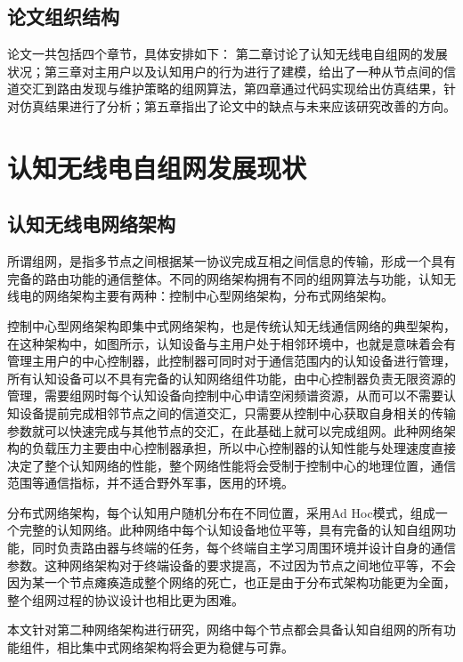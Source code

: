 \documentclass[a4paper,AutoFakeBold,oneside,12pt]{book}
\begin{document}
\section{论文组织结构}
  论文一共包括四个章节，具体安排如下：
  第二章讨论了认知无线电自组网的发展状况；第三章对主用户以及认知用户的行为进行了建模，给出了一种从节点间的信道交汇到路由发现与维护策略的组网算法，第四章通过代码实现给出仿真结果，针对仿真结果进行了分析；第五章指出了论文中的缺点与未来应该研究改善的方向。
\chapter{认知无线电自组网发展现状}
\section{认知无线电网络架构}
  所谓组网，是指多节点之间根据某一协议完成互相之间信息的传输，形成一个具有完备的路由功能的通信整体。不同的网络架构拥有不同的组网算法与功能，认知无线电的网络架构主要有两种：控制中心型网络架构，分布式网络架构。
  
  控制中心型网络架构即集中式网络架构，也是传统认知无线通信网络的典型架构，在这种架构中，如图所示，认知设备与主用户处于相邻环境中，也就是意味着会有管理主用户的中心控制器，此控制器可同时对于通信范围内的认知设备进行管理，所有认知设备可以不具有完备的认知网络组件功能，由中心控制器负责无限资源的管理，需要组网时每个认知设备向控制中心申请空闲频谱资源，从而可以不需要认知设备提前完成相邻节点之间的信道交汇，只需要从控制中心获取自身相关的传输参数就可以快速完成与其他节点的交汇，在此基础上就可以完成组网。此种网络架构的负载压力主要由中心控制器承担，所以中心控制器的认知性能与处理速度直接决定了整个认知网络的性能，整个网络性能将会受制于控制中心的地理位置，通信范围等通信指标，并不适合野外军事，医用的环境。


  分布式网络架构，每个认知用户随机分布在不同位置，采用Ad Hoc模式，组成一个完整的认知网络。此种网络中每个认知设备地位平等，具有完备的认知自组网功能，同时负责路由器与终端的任务，每个终端自主学习周围环境并设计自身的通信参数。这种网络架构对于终端设备的要求提高，不过因为节点之间地位平等，不会因为某一个节点瘫痪造成整个网络的死亡，也正是由于分布式架构功能更为全面，整个组网过程的协议设计也相比更为困难。


  本文针对第二种网络架构进行研究，网络中每个节点都会具备认知自组网的所有功能组件，相比集中式网络架构将会更为稳健与可靠。
\end{document}
